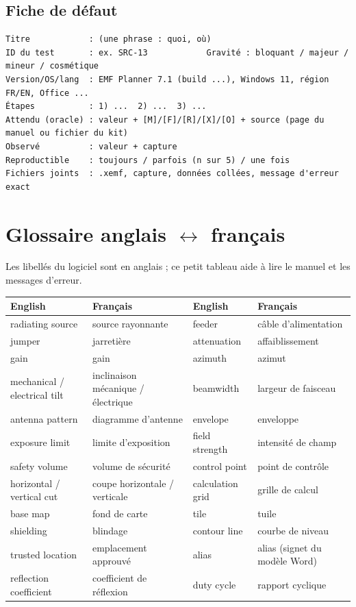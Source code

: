 \subsection*{Fiche de défaut}
\begin{Verbatim}[frame=single,framesep=2mm,fontsize=\footnotesize,rulecolor=\color{accent}]
Titre            : (une phrase : quoi, où)
ID du test       : ex. SRC-13            Gravité : bloquant / majeur / mineur / cosmétique
Version/OS/lang  : EMF Planner 7.1 (build ...), Windows 11, région FR/EN, Office ...
Étapes           : 1) ...  2) ...  3) ...
Attendu (oracle) : valeur + [M]/[F]/[R]/[X]/[O] + source (page du manuel ou fichier du kit)
Observé          : valeur + capture
Reproductible    : toujours / parfois (n sur 5) / une fois
Fichiers joints  : .xemf, capture, données collées, message d'erreur exact
\end{Verbatim}

\section{Glossaire anglais $\leftrightarrow$ français}
Les libellés du logiciel sont en anglais ; ce petit tableau aide à lire le manuel et les messages d'erreur.
\begin{center}\small\renewcommand{\arraystretch}{1.1}
\begin{tabular}{@{}ll@{\qquad}ll@{}}\toprule
\textbf{English} & \textbf{Français} & \textbf{English} & \textbf{Français}\\\midrule
radiating source & source rayonnante & feeder & câble d'alimentation\\
jumper & jarretière & attenuation & affaiblissement\\
gain & gain & azimuth & azimut\\
mechanical / electrical tilt & inclinaison mécanique / électrique & beamwidth & largeur de faisceau\\
antenna pattern & diagramme d'antenne & envelope & enveloppe\\
exposure limit & limite d'exposition & field strength & intensité de champ\\
safety volume & volume de sécurité & control point & point de contrôle\\
horizontal / vertical cut & coupe horizontale / verticale & calculation grid & grille de calcul\\
base map & fond de carte & tile & tuile\\
shielding & blindage & contour line & courbe de niveau\\
trusted location & emplacement approuvé & alias & alias (signet du modèle Word)\\
reflection coefficient & coefficient de réflexion & duty cycle & rapport cyclique\\\bottomrule
\end{tabular}\end{center}
